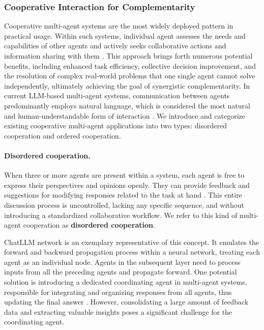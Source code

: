 \subsubsection{Cooperative Interaction for Complementarity} \label{sec:Cooperative Engagement for Complementarity}
Cooperative multi-agent systems are the most widely deployed pattern in practical usage. Within such systems, individual agent assesses the needs and capabilities of other agents and actively seeks collaborative actions and information sharing with them \cite{DBLP:journals/corr/abs-2303-17760}. This approach brings forth numerous potential benefits, including enhanced task efficiency, collective decision improvement, and the resolution of complex real-world problems that one single agent cannot solve independently, ultimately achieving the goal of synergistic complementarity. In current LLM-based multi-agent systems, communication between agents predominantly employs natural language, which is considered the most natural and human-understandable form of interaction \cite{DBLP:journals/corr/abs-2303-17760}. We introduce and categorize existing cooperative multi-agent applications into two types: disordered cooperation and ordered cooperation.

\paragraph{Disordered cooperation.}
When three or more agents are present within a system, each agent is free to express their perspectives and opinions openly. They can provide feedback and suggestions for modifying responses related to the task at hand \cite{DBLP:journals/corr/abs-2307-04738}. This entire discussion process is uncontrolled, lacking any specific sequence, and without introducing a standardized collaborative workflow. We refer to this kind of multi-agent cooperation as \textbf{disordered cooperation}.

ChatLLM network \cite{DBLP:journals/corr/abs-2304-12998} is an exemplary representative of this concept. It emulates the forward and backward propagation process within a neural network, treating each agent as an individual node. Agents in the subsequent layer need to process inputs from all the preceding agents and propagate forward. One potential solution is introducing a dedicated coordinating agent in multi-agent systems, responsible for integrating and organizing responses from all agents, thus updating the final answer \cite{DBLP:journals/corr/abs-2307-05300}. However, consolidating a large amount of feedback data and extracting valuable insights poses a significant challenge for the coordinating agent.

